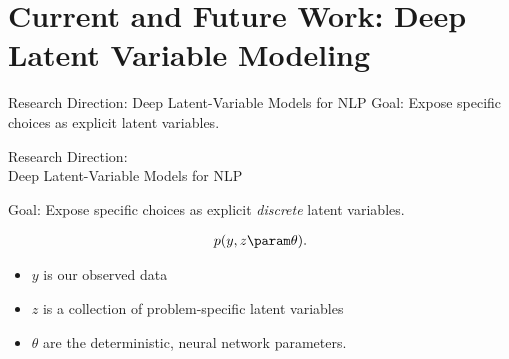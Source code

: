 
\section{Current and Future Work: Deep Latent Variable Modeling}

\begin{frame}{Research Direction: Deep Latent-Variable Models for NLP }
  Goal: Expose specific choices as explicit latent variables.   
   \begin{center}
  \end{center}
\end{frame}

\begin{frame}{Research Direction: \\
      Deep Latent-Variable Models for NLP }

  Goal: Expose specific choices as explicit \textit{discrete} latent variables.


\begin{align*}
p(y, z \param \theta).
\end{align*}

\pause
\begin{itemize}
    \item $y$ is our observed data
    \item $z$ is a collection of problem-specific latent variables
    \item $\theta$ are the deterministic, neural network parameters.
\end{itemize}



\end{frame}

